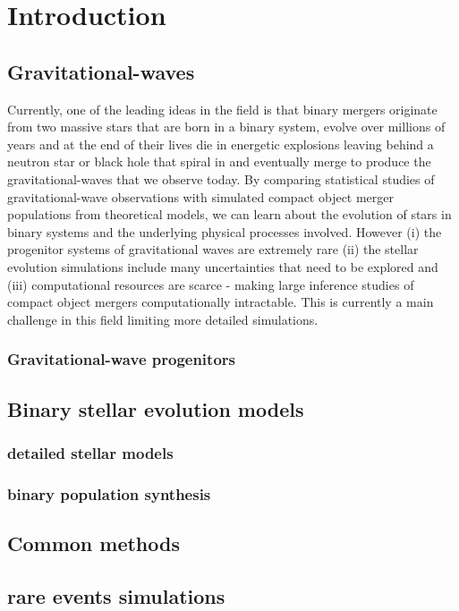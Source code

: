 \chapter{Introduction}
%
\section{Gravitational-waves}
%
Currently, one of the leading ideas in the field is that binary mergers originate from two massive stars that are born in a binary system, evolve over millions of years and at the end of their lives die in energetic explosions leaving behind a neutron star or black hole that spiral in and eventually merge to produce the gravitational-waves that we observe today. By comparing statistical studies of gravitational-wave observations with simulated compact object merger populations from theoretical models, we can learn about the evolution of stars in binary systems and the underlying physical processes involved. However (i) the progenitor systems of gravitational waves are extremely rare (ii) the stellar evolution simulations include many uncertainties that need to be explored and (iii) computational resources are scarce - making large inference studies of compact object mergers computationally intractable. This is currently a main challenge in this field limiting more detailed simulations.
\subsection{Gravitational-wave progenitors}
%
\section{Binary stellar evolution models}
%
\subsection{detailed stellar models}
%
\subsection{binary population synthesis}
%
\section{Common methods}
%
\section{rare events simulations}



